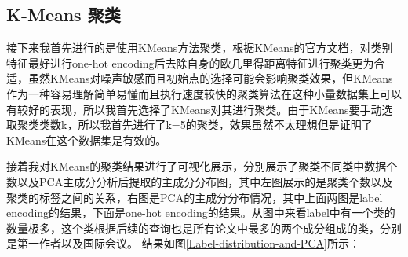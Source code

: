 \subsection{K-Means 聚类}

接下来我首先进行的是使用KMeans方法聚类，根据KMeans的官方文档，对类别特征最好进行one-hot encoding后去除自身的欧几里得距离特征进行聚类更为合适，虽然KMeans对噪声敏感而且初始点的选择可能会影响聚类效果，但KMeans作为一种容易理解简单易懂而且执行速度较快的聚类算法在这种小量数据集上可以有较好的表现，所以我首先选择了KMeans对其进行聚类。由于KMeans要手动选取聚类类数k，所以我首先进行了k=5的聚类，效果虽然不太理想但是证明了KMeans在这个数据集是有效的。

接着我对KMeans的聚类结果进行了可视化展示，分别展示了聚类不同类中数据个数以及PCA主成分分析后提取的主成分分布图，其中左图展示的是聚类个数以及聚类的标签之间的关系，右图是PCA的主成分分布情况，其中上面两图是label encoding的结果，下面是one-hot encoding的结果。从图中来看label中有一个类的数量极多，这个类根据后续的查询也是所有论文中最多的两个成分组成的类，分别是第一作者以及国际会议。
结果如图\ref{Label-distribution-and-PCA}所示：

